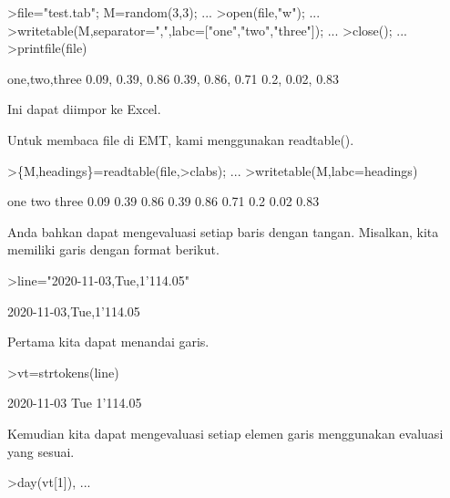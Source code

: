 \documentclass[a4paper,10pt]{article}
\begin{document}
\begin{eulernotebook}
\begin{eulercomment}
\begin{eulercomment}
\begin{eulercomment}
\begin{eulercomment}
\begin{eulercomment}
\begin{eulercomment}
\begin{eulercomment}
\begin{eulercomment}
\begin{eulercomment}
\begin{eulercomment}
\begin{eulercomment}
\begin{eulercomment}
\begin{eulercomment}
\begin{eulercomment}
\begin{eulercomment}
\begin{eulercomment}
\begin{eulercomment}
\begin{eulercomment}
\begin{eulercomment}
\end{eulercomment}
\begin{eulerprompt}
>file="test.tab"; M=random(3,3);  ...
>open(file,"w");  ...
>writetable(M,separator=",",labc=["one","two","three"]);  ...
>close(); ...
>printfile(file)
\end{eulerprompt}
\begin{euleroutput}
  one,two,three
        0.09,      0.39,      0.86
        0.39,      0.86,      0.71
         0.2,      0.02,      0.83
\end{euleroutput}
\begin{eulercomment}
Ini dapat diimpor ke Excel.

Untuk membaca file di EMT, kami menggunakan readtable().
\end{eulercomment}
\begin{eulerprompt}
>\{M,headings\}=readtable(file,>clabs); ...
>writetable(M,labc=headings)
\end{eulerprompt}
\begin{euleroutput}
         one       two     three
        0.09      0.39      0.86
        0.39      0.86      0.71
         0.2      0.02      0.83
\end{euleroutput}
\begin{eulercomment}
Anda bahkan dapat mengevaluasi setiap baris dengan tangan. Misalkan,
kita memiliki garis dengan format berikut.
\end{eulercomment}
\begin{eulerprompt}
>line="2020-11-03,Tue,1'114.05"
\end{eulerprompt}
\begin{euleroutput}
  2020-11-03,Tue,1'114.05
\end{euleroutput}
\begin{eulercomment}
Pertama kita dapat menandai garis.
\end{eulercomment}
\begin{eulerprompt}
>vt=strtokens(line)
\end{eulerprompt}
\begin{euleroutput}
  2020-11-03
  Tue
  1'114.05
\end{euleroutput}
\begin{eulercomment}
Kemudian kita dapat mengevaluasi setiap elemen garis menggunakan
evaluasi yang sesuai.
\end{eulercomment}
\begin{eulerprompt}
>day(vt[1]),  ...

\end{eulerprompt}
\end{eulercomment}
\end{eulercomment}
\end{eulercomment}
\end{eulercomment}
\end{eulercomment}
\end{eulercomment}
\end{eulercomment}
\end{eulercomment}
\end{eulercomment}
\end{eulercomment}
\end{eulercomment}
\end{eulercomment}
\end{eulercomment}
\end{eulercomment}
\end{eulercomment}
\end{eulercomment}
\end{eulercomment}
\end{eulercomment}
\end{eulernotebook}
\end{document}

